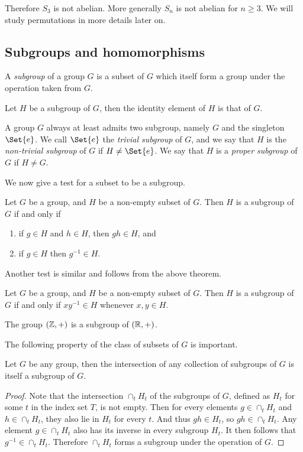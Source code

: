 \documentclass[main.tex]{subfiles}
\begin{document}
			Therefore $S_3$ is not abelian. More generally $S_n$ is not abelian for $n \geq 3$. We will study permutations in more details later on.

	\subsection{Subgroups and homomorphisms}
		\begin{definition}
			A \textit{subgroup} of a group $G$ is a subset of $G$ which itself form a group under the operation taken from $G$.
		\end{definition}
		\begin{theorem}
			Let $H$ be a subgroup of $G$, then the identity element of $H$ is that of $G$.
		\end{theorem}
	
		A group $G$ always at least admits two subgroup, namely $G$ and the singleton $\Set{e}$. We call $\Set{e}$ the \textit{trivial subgroup} of $G$, and we say that $H$ is the \textit{non-trivial subgroup} of $G$ if $H \neq \Set{e}$. We say that $H$ is a \textit{proper subgroup} of $G$ if $H \neq G$.
		
		We now give a test for a subset to be a subgroup.
		
		\begin{theorem}
			Let $G$ be a group, and $H$ be a non-empty subset of $G$. Then $H$ is a subgroup of $G$ if and only if
			\begin{enumerate}
				\item if $g \in H$ and $h \in H$, then $gh \in H$, and
				\item if $g \in H$ then $g^{-1} \in H$.
			\end{enumerate}
		\end{theorem}
		
		Another test is similar and follows from the above theorem.
		\begin{theorem}
			Let $G$ be a group, and $H$ be a non-empty subset of $G$. Then $H$ is a subgroup of $G$ if and only if $xy^{-1} \in H$ whenever $x,y \in H$.
		\end{theorem}
		\begin{example}
			The group $(\mathbb Z, +)$ is a subgroup of $(\mathbb R, +)$.
		\end{example}
			The following property of the class of subsets of $G$ is important.
		\begin{theorem}
			Let $G$ be any group, then the intersection of any collection of subgroups of $G$ is itself a subgroup of $G$.
		\end{theorem}
			\begin{proof}
				Note that the intersection $\cap_t H_t$ of the subgroups of $G$, defined as $H_t$ for some $t$ in the index set $T$, is not empty. Then for every elements $g \in \cap_t H_t$ and $h \in \cap_t H_t$, they also lie in $H_t$ for every $t$. And thus $gh \in H_t$, so $gh \in \cap_t H_t$. Any element $g \in \cap_t H_t$ also has its inverse in every subgroup $H_t$. It then follows that $g^{-1} \in \cap_t H_t$. Therefore $\cap_t H_t$ forms a subgroup under the operation of $G$.
			\end{proof}
		
\end{document}
